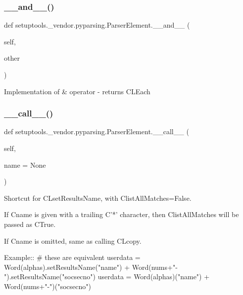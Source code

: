 \subsubsection{\texorpdfstring{\+\_\+\+\_\+and\+\_\+\+\_\+()}{\_\_and\_\_()}}
{\footnotesize\ttfamily def setuptools.\+\_\+vendor.\+pyparsing.\+Parser\+Element.\+\_\+\+\_\+and\+\_\+\+\_\+ (\begin{DoxyParamCaption}\item[{}]{self,  }\item[{}]{other }\end{DoxyParamCaption})}

\begin{DoxyVerb}Implementation of & operator - returns C{L{Each}}
\end{DoxyVerb}
 \mbox{\label{classsetuptools_1_1__vendor_1_1pyparsing_1_1_parser_element_a7f154aa4d9339f88d2306325bf99b953}} 
\subsubsection{\texorpdfstring{\+\_\+\+\_\+call\+\_\+\+\_\+()}{\_\_call\_\_()}}
{\footnotesize\ttfamily def setuptools.\+\_\+vendor.\+pyparsing.\+Parser\+Element.\+\_\+\+\_\+call\+\_\+\+\_\+ (\begin{DoxyParamCaption}\item[{}]{self,  }\item[{}]{name = {\ttfamily None} }\end{DoxyParamCaption})}

\begin{DoxyVerb}Shortcut for C{L{setResultsName}}, with C{listAllMatches=False}.

If C{name} is given with a trailing C{'*'} character, then C{listAllMatches} will be
passed as C{True}.
   
If C{name} is omitted, same as calling C{L{copy}}.

Example::
    # these are equivalent
    userdata = Word(alphas).setResultsName("name") + Word(nums+"-").setResultsName("socsecno")
    userdata = Word(alphas)("name") + Word(nums+"-")("socsecno")             
\end{DoxyVerb}
 \mbox{\label{classsetuptools_1_1__vendor_1_1pyparsing_1_1_parser_element_a9f199096d8be7787f214deb901d50f86}} 
